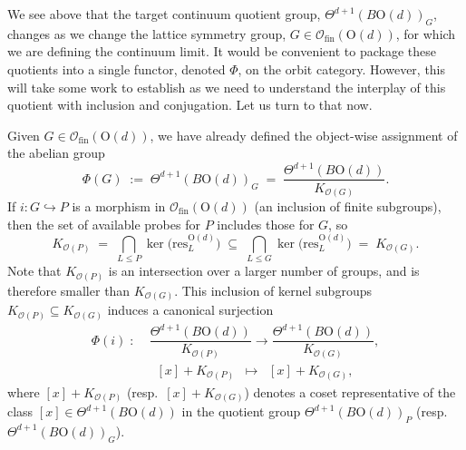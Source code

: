 \documentclass[aps,prx,reprint,superscriptaddress,twocolumn,amsmath,amssymb,amsfonts, nofootinbib]{revtex4-2}
\newcommand{\ofin}{\mathcal{O}_{\text{fin}}}
\newcommand{\res}{\text{res}}
\theoremstyle{apsstyle}
\begin{document}
\bigskip

We see above that the target continuum quotient group, $\Theta^{d+1}(B\mathrm{O}(d))_{G}$, changes as we change the lattice symmetry group, $G\in \ofin(\mathrm{O}(d))$, for which we are defining the continuum limit. It would be convenient to package these quotients into a single functor, denoted $\Phi$, on the orbit category. However, this will take some work to establish as we need to understand the interplay of this quotient with inclusion and conjugation. Let us turn to that now. 

Given $G\in \ofin(\mathrm{O}(d))$, we have already defined the object-wise assignment of the abelian group
\begin{equation*}
    \Phi(G)\;:=\;\Theta^{d+1}(B\mathrm{O}(d))_{G}
    \;=\;
    \dfrac{\Theta^{d+1}(B\mathrm{O}(d))}{K_{\mathcal{O}(G)}}.
\end{equation*}
If $i: G\hookrightarrow P$ is a morphism in $\ofin(\mathrm{O}(d))$ (an inclusion of finite subgroups), then the set of available probes for $P$ includes those for $G$, so
\begin{equation}
    K_{\mathcal{O}(P)}
    \;=\;
    \bigcap_{L\le P}\ker\bigl(\res^{\mathrm{O}(d)}_{L}\bigr)
    \;\subseteq\;
    \bigcap_{L\le G}\ker\bigl(\res^{\mathrm{O}(d)}_{L}\bigr)
    \;=\;
    K_{\mathcal{O}(G)}.
    \label{eq:quotient_res_rel}
\end{equation}
Note that $K_{\mathcal{O}(P)}$ is an intersection over a larger number of groups, and is therefore smaller than $K_{\mathcal{O}(G)}$. This inclusion of kernel subgroups $K_{\mathcal{O}(P)}\subseteq K_{\mathcal{O}(G)}$ induces a canonical surjection
\begin{align}
\label{eq:inclusion}
    \Phi(i)\;:\;
    &\dfrac{\Theta^{d+1}(B\mathrm{O}(d))}{K_{\mathcal{O}(P)}}
    \longrightarrow
    \dfrac{\Theta^{d+1}(B\mathrm{O}(d))}{K_{\mathcal{O}(G)}},\\
    &\;\;[x]+K_{\mathcal{O}(P)} \;\; \longmapsto \;\;[x]+K_{\mathcal{O}(G)},
    \nonumber
\end{align}
where $[x]+K_{\mathcal{O}(P)}$ (resp.\ $[x]+K_{\mathcal{O}(G)}$) denotes a coset representative of the class $[x]\in\Theta^{d+1}(B\mathrm{O}(d))$ in the quotient group $\Theta^{d+1}(B\mathrm{O}(d))_{P}$ (resp.\ $\Theta^{d+1}(B\mathrm{O}(d))_{G}$). 

\bigskip 
\end{document}
